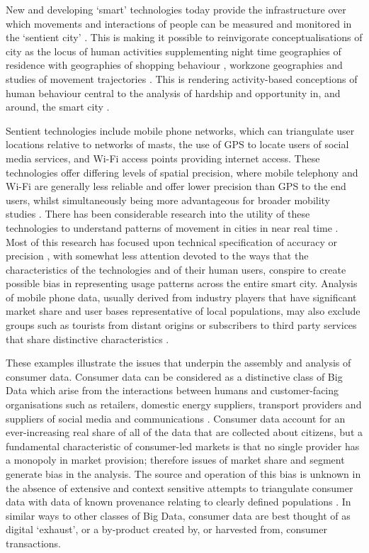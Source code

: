 New and developing ‘smart’ technologies today provide the infrastructure over
which movements and interactions of people can be measured and monitored in the
‘sentient city’ \citep{amin2017seeing}. This is making it possible to
reinvigorate conceptualisations of city as the locus of human activities
supplementing night time geographies of residence \citep{martin2015developing}
with geographies of shopping behaviour \citep{lloyd2018detecting}, workzone
geographies \citep{singleton2018london} and studies of movement trajectories
\citep{campbell2008transforming}. This is rendering activity-based conceptions
of human behaviour central to the analysis of hardship and opportunity in, and
around, the smart city \citep{venerandi2015measuring}.

Sentient technologies include mobile phone networks, which can triangulate user
locations relative to networks of masts, the use of GPS to locate users of
social media services, and Wi-Fi access points providing internet access.  These
technologies offer differing levels of spatial precision, where mobile telephony
and Wi-Fi are generally less reliable and offer lower precision than GPS to the
end users, whilst simultaneously being more advantageous for broader mobility
studies \citep{pinelli2015comparing}. There has been considerable research into
the utility of these technologies to understand patterns of movement in cities
in near real time \citep{candia2008uncovering, gonzalez2008understanding,
calabrese2013understanding}.  Most of this research has focused upon technical
specification of accuracy or precision \citep{song2010limits,lane2010survey},
with somewhat less attention devoted to the ways that the characteristics of the
technologies and of their human users, conspire to create possible bias in
representing usage patterns across the entire smart city. Analysis of mobile
phone data, usually derived from industry players that have significant market
share and user bases representative of local populations, may also exclude
groups such as tourists from distant origins or subscribers to third party
services that share distinctive characteristics \citep{di2016mind}.

These examples illustrate the issues that underpin the assembly and analysis of
consumer data. Consumer data can be considered as a distinctive class of Big
Data which arise from the interactions between humans and customer-facing
organisations such as retailers, domestic energy suppliers, transport providers
and suppliers of social media and communications \citep{cdrc2018consumer}.
Consumer data account for an ever-increasing real share of all of the data that
are collected about citizens, but a fundamental characteristic of consumer-led
markets is that no single provider has a monopoly in market provision; therefore
issues of market share and segment generate bias in the analysis.  The source
and operation of this bias is unknown in the absence of extensive and context
sensitive attempts to triangulate consumer data with data of known provenance
relating to clearly defined populations \citep{lansley2016deriving}.  In similar
ways to other classes of Big Data, consumer data are best thought of as digital
‘exhaust’, or a by-product created by, or harvested from, consumer transactions.


